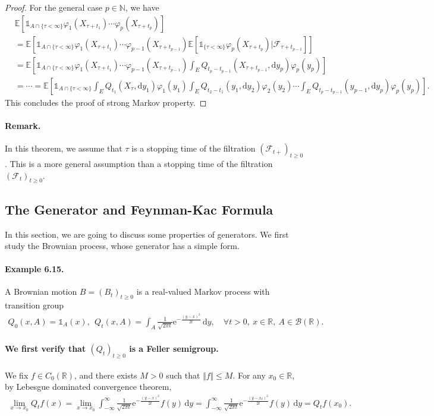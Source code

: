 \documentclass{article}
\numberwithin{equation}{section}
\newcommand{\e}{\mathrm{e}}
\newcommand{\E}{\mathbb{E}}
\renewcommand{\d}{\mathrm{d}}
\theoremstyle{plain}
\theoremstyle{definition}
\begin{document}
\begin{proof}
For the general case $p\in\mathbb{N}$, we have
\begin{align*}
	&\E\left[\mathds{1}_{A\cap\{\tau<\infty\}}\varphi_1(X_{\tau+t_1})\cdots\varphi_p(X_{\tau+t_p})\right]\\
	&= \E\left[\mathds{1}_{A\cap\{\tau<\infty\}}\varphi_1(X_{\tau+t_1})\cdots\varphi_{p-1}(X_{\tau+t_{p-1}})\E\left[\mathds{1}_{\{\tau<\infty\}}\varphi_p(X_{\tau+t_p})|\mathscr{F}_{\tau+t_{p-1}}\right]\right]\\
	&=\E\left[\mathds{1}_{A\cap\{\tau<\infty\}}\varphi_1(X_{\tau+t_1})\cdots\varphi_{p-1}(X_{\tau+t_{p-1}})\int_E Q_{t_p-t_{p-1}}(X_{\tau+t_{p-1}},\d y_p)\varphi_p(y_p)\right]\\
	&=\cdots = \E\left[\mathds{1}_{A\cap\{\tau<\infty\}}\int_E Q_{t_1}(X_\tau,\d y_1)\varphi_1(y_1)\int_E Q_{t_2-t_1}(y_1,\d y_2)\varphi_2(y_2)\cdots\int_E Q_{t_p-t_{p-1}}(y_{p-1},\d y_p)\varphi_p(y_p)\right].
\end{align*}
This concludes the proof of strong Markov property.
\end{proof}

\paragraph{Remark.} In this theorem, we assume that $\tau$ is a stopping time of the filtration $(\mathscr{F}_{t+})_{t\geq 0}$. This is a more general assumption than a stopping time of the filtration $(\mathscr{F}_t)_{t\geq 0}$.

\newpage
\subsection{The Generator and Feynman-Kac Formula}
In this section, we are going to discuss some properties of generators. We first study the Brownian process, whose generator has a simple form.

\paragraph{Example 6.15.\label{example:6.15}} A Brownian motion $B=(B_t)_{t\geq 0}$ is a real-valued Markov process with transition group
\begin{align*}
	Q_0(x,A)=\mathds{1}_A(x),\ \ Q_t(x,A)=\int_A\frac{1}{\sqrt{2\pi t}}\e^{-\frac{(y-x)^2}{2t}}\,\d y,\quad \forall t> 0,\ x\in\mathbb{R},\ A\in\mathscr{B}(\mathbb{R}).
\end{align*}

\paragraph{We first verify that $(Q_t)_{t\geq 0}$ is a Feller semigroup.} We fix $f\in C_0(\mathbb{R})$, and there exists $M>0$ such that $\Vert f\Vert\leq M$. For any $x_0\in\mathbb{R}$, by Lebesgue dominated convergence theorem,
\begin{align*}
	\lim_{x\to x_0}Q_t f(x) = \lim_{x\to x_0}\int_{-\infty}^\infty\frac{1}{\sqrt{2\pi t}}\e^{-\frac{(y-x)^2}{2t}}f(y)\,\d y = \int_{-\infty}^\infty\frac{1}{\sqrt{2\pi t}}\e^{-\frac{(y-x_0)^2}{2t}}f(y)\,\d y = Q_tf(x_0).
\end{align*}
\end{document}
